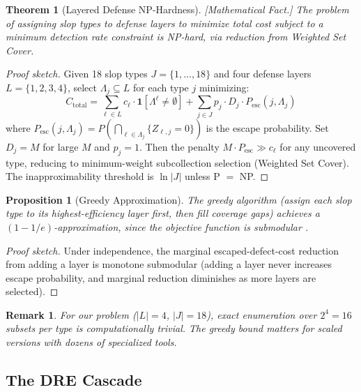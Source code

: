 \documentclass[11pt, a4paper, copyright]{googledeepmind}
\newtheorem{theorem}{Theorem}[section]
\newtheorem{proposition}{Proposition}[section]
\newtheorem*{remark}{Remark}
\begin{document}
\begin{theorem}[Layered Defense NP-Hardness]
\label{thm:defense-nphard}
\emph{[Mathematical Fact.]} The problem of assigning slop types to defense layers to minimize total cost subject to a minimum detection rate constraint is NP-hard, via reduction from Weighted Set Cover.
\end{theorem}

\begin{proof}[Proof sketch]
Given 18 slop types $J = \{1, \ldots, 18\}$ and four defense layers $L = \{1, 2, 3, 4\}$, select $\Lambda_j \subseteq L$ for each type $j$ minimizing:
\begin{equation}
C_{\mathrm{total}} = \sum_{\ell \in L} c_\ell \cdot \mathbf{1}[\Lambda^\ell \neq \emptyset] + \sum_{j \in J} p_j \cdot D_j \cdot P_{\mathrm{esc}}(j, \Lambda_j)
\end{equation}
where $P_{\mathrm{esc}}(j, \Lambda_j) = P(\bigcap_{\ell \in \Lambda_j} \{Z_{\ell,j} = 0\})$ is the escape probability. Set $D_j = M$ for large $M$ and $p_j = 1$. Then the penalty $M \cdot P_{\mathrm{esc}} \gg c_\ell$ for any uncovered type, reducing to minimum-weight subcollection selection (Weighted Set Cover). The inapproximability threshold is $\ln |J|$ unless P $=$ NP.
\end{proof}

\begin{proposition}[Greedy Approximation]
\label{prop:greedy}
The greedy algorithm (assign each slop type to its highest-efficiency layer first, then fill coverage gaps) achieves a $(1-1/e)$-approximation, since the objective function is submodular \citep{nemhauser1978}.
\end{proposition}

\begin{proof}[Proof sketch]
Under independence, the marginal escaped-defect-cost reduction from adding a layer is monotone submodular (adding a layer never increases escape probability, and marginal reduction diminishes as more layers are selected).
\end{proof}

\begin{remark}
For our problem ($|L| = 4$, $|J| = 18$), exact enumeration over $2^4 = 16$ subsets per type is computationally trivial. The greedy bound matters for scaled versions with dozens of specialized tools.
\end{remark}

\subsection{The DRE Cascade}
\end{document}
